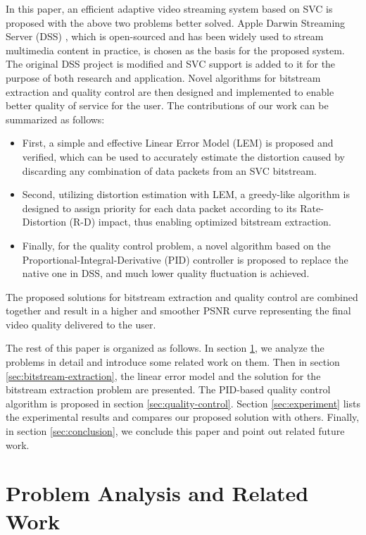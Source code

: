 \documentclass[journal]{IEEEtran}
\begin{document}
In this paper, an efficient adaptive video streaming system based on SVC is proposed with the above two problems better solved. Apple Darwin Streaming Server (DSS) \cite{DSS}, which is open-sourced and has been widely used to stream multimedia content in practice, is chosen as the basis for the proposed system. The original DSS project is modified and SVC support is added to it for the purpose of both research and application. Novel algorithms for bitstream extraction and quality control are then designed and implemented to enable better quality of service for the user. The contributions of our work can be summarized as follows:
\begin{itemize}
\item First, a simple and effective Linear Error Model (LEM) is proposed and verified, which can be used to accurately estimate the distortion caused by discarding any combination of data packets from an SVC bitstream.
\item Second, utilizing distortion estimation with LEM, a greedy-like algorithm is designed to assign priority for each data packet according to its Rate-Distortion (R-D) impact, thus enabling optimized bitstream extraction.
\item Finally, for the quality control problem, a novel algorithm based on the Proportional-Integral-Derivative (PID) controller is proposed to replace the native one in DSS, and much lower quality fluctuation is achieved.
\end{itemize}

The proposed solutions for bitstream extraction and quality control are combined together and result in a higher and smoother PSNR curve representing the final video quality delivered to the user.

The rest of this paper is organized as follows. In section \ref{sec:analysis}, we analyze the problems in detail and introduce some related work on them. Then in section \ref{sec:bitstream-extraction}, the linear error model and the solution for the bitstream extraction problem are presented. The PID-based quality control algorithm is proposed in section \ref{sec:quality-control}. Section \ref{sec:experiment} lists the experimental results and compares our proposed solution with others. Finally, in section \ref{sec:conclusion}, we conclude this paper and point out related future work.


\section{Problem Analysis and Related Work}
\label{sec:analysis}
\end{document}
